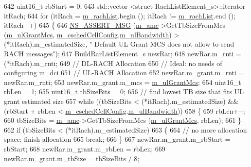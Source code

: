 \begin{DoxyCode}
642   uint16\_t rbStart = 0;
643   std::vector <struct RachListElement\_s>::iterator itRach;
644   \textcolor{keywordflow}{for} (itRach = \hyperlink{classns3_1_1RrFfMacScheduler_a471cdca79a50c90f7c871c15d02755fc}{m\_rachList}.begin (); itRach != \hyperlink{classns3_1_1RrFfMacScheduler_a471cdca79a50c90f7c871c15d02755fc}{m\_rachList}.end (); itRach++)
645     \{
646       \hyperlink{assert_8h_aff5ece9066c74e681e74999856f08539}{NS\_ASSERT\_MSG} (\hyperlink{classns3_1_1RrFfMacScheduler_ad4ff8c2f667affc956f298199d8c8fa5}{m\_amc}->GetTbSizeFromMcs (\hyperlink{classns3_1_1RrFfMacScheduler_ac03ec32deb759ca862b6ab9475929798}{m\_ulGrantMcs}, 
      \hyperlink{classns3_1_1RrFfMacScheduler_a809c6237863709f97fc450b1a2ba60d4}{m\_cschedCellConfig}.\hyperlink{structns3_1_1FfMacCschedSapProvider_1_1CschedCellConfigReqParameters_a5ab5b102878e6e7e7727a14af4a64d2f}{m\_ulBandwidth}) > (*itRach).m\_estimatedSize, \textcolor{stringliteral}{" Default UL
       Grant MCS does not allow to send RACH messages"});
647       BuildRarListElement\_s newRar;
648       newRar.m\_rnti = (*itRach).m\_rnti;
649       \textcolor{comment}{// DL-RACH Allocation}
650       \textcolor{comment}{// Ideal: no needs of configuring m\_dci}
651       \textcolor{comment}{// UL-RACH Allocation}
652       newRar.m\_grant.m\_rnti = newRar.m\_rnti;
653       newRar.m\_grant.m\_mcs = \hyperlink{classns3_1_1RrFfMacScheduler_ac03ec32deb759ca862b6ab9475929798}{m\_ulGrantMcs};
654       uint16\_t rbLen = 1;
655       uint16\_t tbSizeBits = 0;
656       \textcolor{comment}{// find lowest TB size that fits UL grant estimated size}
657       \textcolor{keywordflow}{while} ((tbSizeBits < (*itRach).m\_estimatedSize) && (rbStart + rbLen < 
      \hyperlink{classns3_1_1RrFfMacScheduler_a809c6237863709f97fc450b1a2ba60d4}{m\_cschedCellConfig}.\hyperlink{structns3_1_1FfMacCschedSapProvider_1_1CschedCellConfigReqParameters_a5ab5b102878e6e7e7727a14af4a64d2f}{m\_ulBandwidth}))
658         \{
659           rbLen++;
660           tbSizeBits = \hyperlink{classns3_1_1RrFfMacScheduler_ad4ff8c2f667affc956f298199d8c8fa5}{m\_amc}->GetTbSizeFromMcs (\hyperlink{classns3_1_1RrFfMacScheduler_ac03ec32deb759ca862b6ab9475929798}{m\_ulGrantMcs}, rbLen);
661         \}
662       \textcolor{keywordflow}{if} (tbSizeBits < (*itRach).m\_estimatedSize)
663         \{
664           \textcolor{comment}{// no more allocation space: finish allocation}
665           \textcolor{keywordflow}{break};
666         \}
667       newRar.m\_grant.m\_rbStart = rbStart;
668       newRar.m\_grant.m\_rbLen = rbLen;
669       newRar.m\_grant.m\_tbSize = tbSizeBits / 8;

\end{DoxyCode}
